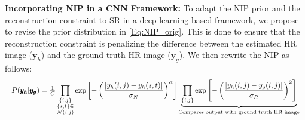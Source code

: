 \documentclass[9pt]{article}
\newcommand{\vect}[1]{\pmb{#1}}
\def\bea{\begin{eqnarray}}
\def\eea{\end{eqnarray}}
\begin{document}
\noindent \textbf{Incorporating NIP in a CNN Framework:} To adapt the NIP prior and the reconstruction constraint to SR in a deep learning-based framework, we propose to revise the prior distribution in \eqref{Eq:NIP_orig}. This is done   to ensure that the reconstruction constraint is penalizing the difference between the estimated HR image ($\vect y_h$) and the ground truth HR image ($\vect y_g$). %
We then rewrite the NIP as follows:
\bea \resizebox{\columnwidth}{!}{$
        P(\vect {y_h} | \vect {y_g}) = \frac{1}{C} \displaystyle\prod_{\substack{\{i,j\} \\ \{s,t\}\in \\\mathcal{N}(i,j)} }  \exp \left[ - \left( \frac{|y_h(i,j) - y_h(s,t)|}{\sigma_N} \right)^\alpha \right]
                                    \underbrace{ \prod_{ \{i,j\}  }  \exp \left[ - \left( \frac{| y_h(i,j)  - y_g(i,j)|}{\sigma_R} \right)^2 \right] }_{\text{Compares output with ground truth HR image}}
                                    $}
                                    \label{Eq:NIP_prior}
\eea
\end{document}
